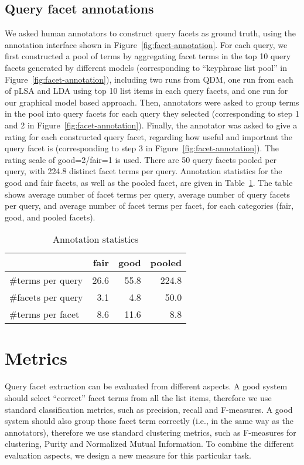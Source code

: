 \subsection{Query facet annotations}
We asked human annotators to construct query facets as ground truth, using the annotation interface shown in Figure~\ref{fig:facet-annotation}.
For each query, we first constructed a pool of terms by aggregating facet terms in the top 10 query facets generated by different models (corresponding to ``keyphrase list pool'' in Figure~\ref{fig:facet-annotation}), including two runs from QDM, one run from each of pLSA and LDA using top 10 list items in each query facets, and one run for our graphical model based approach. 
Then, annotators were asked to group terms in the pool into query facets for each query they selected (corresponding to step 1 and 2 in Figure~\ref{fig:facet-annotation}).
Finally, the annotator was asked to give a rating for each constructed query facet, regarding how useful and important the query facet is (corresponding to step 3 in Figure~\ref{fig:facet-annotation}). The rating scale of good=2/fair=1 is used. There are 50 query facets pooled per query, with 224.8 distinct facet terms per query. Annotation statistics for the good and fair facets, as well as the pooled facet, are given in Table~\ref{tab:annotations}. The table shows average number of facet terms per query, average number of query facets per query, and average number of facet terms per facet, for each categories (fair, good, and pooled facets).
\begin{table}[ht!]
\centering
\caption{Annotation statistics}
\label{tab:annotations}
\begin{tabular}{|l|r|r|r|} \hline
& fair & good & pooled\\ \hline
\#terms per query & 26.6 & 55.8 & 224.8\\ 
\#facets per query & 3.1 & 4.8 & 50.0 \\ 
\#terms per facet & 8.6 & 11.6 & 8.8 \\ \hline
\end{tabular}
\end{table}

\section{Metrics} 
\label{sec:ie-metrics}
Query facet extraction can be evaluated from different aspects. A good system should select ``correct'' facet terms from all the list items, therefore we use standard classification metrics, such as precision, recall and F-measures. A good system should also group those facet term correctly (i.e., in the same way as the annotators), therefore we use standard clustering metrics, such as F-measures for clustering, Purity and Normalized Mutual Information. To combine the different evaluation aspects, we design a new measure for this particular task.
